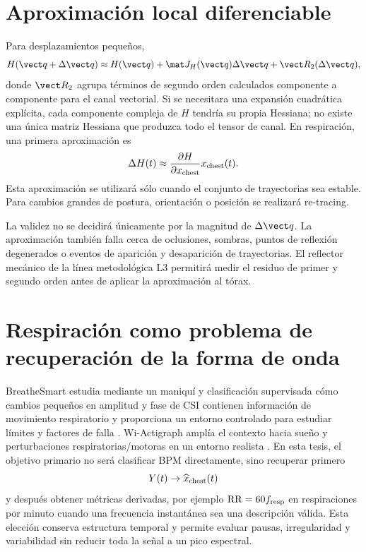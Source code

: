 \section{Aproximación local diferenciable}

Para desplazamientos pequeños,
\begin{equation}
H(\vect q+\Delta\vect q)
\approx H(\vect q)+
\mat J_H(\vect q)\Delta\vect q+
\vect R_2(\Delta\vect q),
\label{eq:taylor_dynamic}
\end{equation}
donde $\vect R_2$ agrupa términos de segundo orden calculados componente a componente para el canal vectorial. Si se necesitara una expansión cuadrática explícita, cada componente compleja de $H$ tendría su propia Hessiana; no existe una única matriz Hessiana que produzca todo el tensor de canal.
En respiración, una primera aproximación es
\begin{equation}
\Delta H(t)\approx
\frac{\partial H}{\partial x_{\rm chest}}
 x_{\rm chest}(t).
\end{equation}
Esta aproximación se utilizará sólo cuando el conjunto de trayectorias sea estable. Para cambios grandes de postura, orientación o posición se realizará re-tracing.

La validez no se decidirá únicamente por la magnitud de $\Delta\vect q$. La aproximación también falla cerca de oclusiones, sombras, puntos de reflexión degenerados o eventos de aparición y desaparición de trayectorias. El reflector mecánico de la línea metodológica L3 permitirá medir el residuo de primer y segundo orden antes de aplicar la aproximación al tórax.

\section{Respiración como problema de recuperación de la forma de onda}

BreatheSmart estudia mediante un maniquí y clasificación supervisada cómo cambios pequeños en amplitud y fase de CSI contienen información de movimiento respiratorio y proporciona un entorno controlado para estudiar límites y factores de falla \citep{Mosleh2022BreatheSmart}. Wi-Actigraph amplía el contexto hacia sueño y perturbaciones respiratorias/motoras en un entorno realista \citep{Alzaabi2025WiActigraph}. En esta tesis, el objetivo primario no será clasificar BPM directamente, sino recuperar primero
\begin{equation}
Y(t)\rightarrow \widehat x_{\rm chest}(t)
\end{equation}
y después obtener métricas derivadas, por ejemplo $\mathrm{RR}=60f_{\rm resp}$ en respiraciones por minuto cuando una frecuencia instantánea sea una descripción válida. Esta elección conserva estructura temporal y permite evaluar pausas, irregularidad y variabilidad sin reducir toda la señal a un pico espectral.

